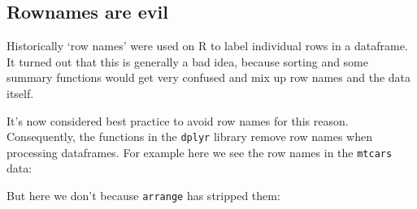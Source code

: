 \documentclass[]{article}
\newenvironment{Shaded}{\begin{snugshade}}{\end{snugshade}}
\newcommand{\DecValTok}[1]{\textcolor[rgb]{0.00,0.00,0.81}{#1}}
\newcommand{\FloatTok}[1]{\textcolor[rgb]{0.00,0.00,0.81}{#1}}
\newcommand{\KeywordTok}[1]{\textcolor[rgb]{0.13,0.29,0.53}{\textbf{#1}}}
\newcommand{\NormalTok}[1]{#1}
\newcommand{\OperatorTok}[1]{\textcolor[rgb]{0.81,0.36,0.00}{\textbf{#1}}}
\newcommand{\StringTok}[1]{\textcolor[rgb]{0.31,0.60,0.02}{#1}}
\begin{document}
\hypertarget{rownames}{%
\subsection*{Rownames are evil}\label{rownames}}

Historically `row names' were used on R to label individual rows in a dataframe.
It turned out that this is generally a bad idea, because sorting and some
summary functions would get very confused and mix up row names and the data
itself.

It's now considered best practice to avoid row names for this reason.
Consequently, the functions in the \texttt{dplyr} library remove row names when
processing dataframes. For example here we see the row names in the \texttt{mtcars}
data:

\begin{Shaded}
\end{Shaded}

But here we don't because \texttt{arrange} has stripped them:

\begin{Shaded}
\end{Shaded}
\end{document}
